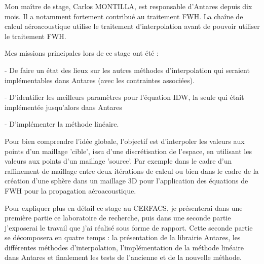 Mon maître de stage, Carlos MONTILLA, est responsable d'Antares depuis dix mois. Il a notamment fortement contribué au traitement \ac{FWH}. La chaîne de calcul aéroacoustique utilise le traitement d'interpolation avant de pouvoir utiliser le traitement FWH.

Mes missions principales lors de ce stage ont été :

- De faire un état des lieux sur les autres méthodes d'interpolation qui seraient 
implémentables dans Antares (avec les contraintes associées).

- D'identifier les meilleurs paramètres pour l'équation \ac{IDW}, la seule qui était implémentée jusqu'alors dans Antares %

- D'implémenter la méthode linéaire.  %

\vspace{0,5cm}

Pour bien comprendre l'idée globale, l'objectif est d'interpoler les valeurs aux points d'un maillage 'cible', issu d'une discrétisation de l'espace, en utilisant les valeurs aux points d'un maillage 'source'.
Par exemple dans le cadre d'un raffinement de maillage entre deux itérations de calcul ou bien dans le cadre de la création d'une sphère dans un maillage 3D pour l'application des équations de FWH pour la propagation aéroacoustique.

\vspace{0,5cm}

Pour expliquer plus en détail ce stage au CERFACS, je présenterai dans une première partie ce laboratoire de recherche, puis dans une seconde partie j'exposerai le travail que j'ai réalisé sous forme de rapport. Cette seconde partie se décomposera en quatre temps : la présentation de la librairie Antares, les différentes méthodes d'interpolation, l'implémentation de la méthode linéaire dans Antares et finalement les tests de l'ancienne et de la nouvelle méthode.